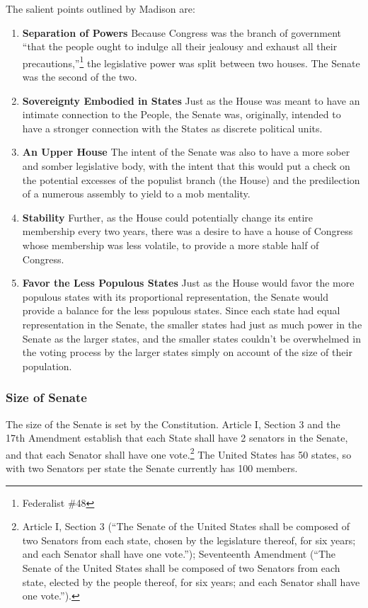 \begin{quote}
\end{quote}

The salient points outlined by Madison are:
\begin{enumerate}
\item \textbf{Separation of Powers} Because Congress was the branch of government ``that the people ought to indulge all their jealousy and exhaust all their precautions,''\footnote{Federalist \#48} the legislative power was split between two houses.  The Senate was the second of the two.
\item \textbf{Sovereignty Embodied in States} Just as the House was meant to have an intimate connection to the People, the Senate was, originally, intended to have a stronger connection with the States as discrete political units.
\item \textbf{An Upper House} The intent of the Senate was also to have a more sober and somber legislative body, with the intent that this would put a check on the potential excesses of the populist branch (the House) and the predilection of a numerous assembly to yield to a mob mentality.
\item \textbf{Stability} Further, as the House could potentially change its entire membership every two years, there was a desire to have a house of Congress whose membership was less volatile, to provide a more stable half of Congress.
\item \textbf{Favor the Less Populous States} Just as the House would favor the more populous states with its proportional representation, the Senate would provide a balance for the less populous states.  Since each state had equal representation in the Senate, the smaller states had just as much power in the Senate as the larger states, and the smaller states couldn't be overwhelmed in the voting process by the larger states simply on account of the size of their population.
\end{enumerate}


\subsubsection{Size of Senate}
The size of the Senate is set by the Constitution.  Article I, Section 3 and the 17th Amendment establish that each State shall have 2 senators in the Senate, and that each Senator shall have one vote.\footnote{Article I, Section 3 (``The Senate of the United States shall be composed of two Senators from each state, chosen by the legislature thereof, for six years; and each Senator shall have one vote.''); Seventeenth Amendment (``The Senate of the United States shall be composed of two Senators from each state, elected by the people thereof, for six years; and each Senator shall have one vote.'').}
The United States has 50 states, so with two Senators per state the Senate currently has 100 members.

